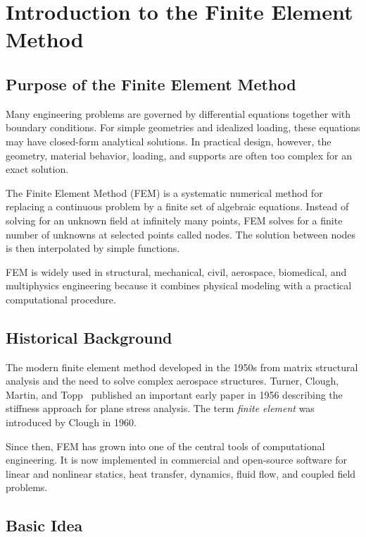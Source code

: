 \chapter{Introduction to the Finite Element Method}
\label{ch:intro}

\section{Purpose of the Finite Element Method}

Many engineering problems are governed by differential equations together with
boundary conditions. For simple geometries and idealized loading, these
equations may have closed-form analytical solutions. In practical design,
however, the geometry, material behavior, loading, and supports are often too
complex for an exact solution.

The Finite Element Method (FEM) is a systematic numerical method for replacing
a continuous problem by a finite set of algebraic equations. Instead of solving
for an unknown field at infinitely many points, FEM solves for a finite number
of unknowns at selected points called nodes. The solution between nodes is then
interpolated by simple functions.

FEM is widely used in structural, mechanical, civil, aerospace, biomedical, and
multiphysics engineering because it combines physical modeling with a practical
computational procedure.

\section{Historical Background}

The modern finite element method developed in the 1950s from matrix structural
analysis and the need to solve complex aerospace structures. Turner, Clough,
Martin, and Topp~\cite{zienkiewicz2005fem} published an important early paper
in 1956 describing the stiffness approach for plane stress analysis. The term
\emph{finite element} was introduced by Clough in 1960.

Since then, FEM has grown into one of the central tools of computational
engineering. It is now implemented in commercial and open-source software for
linear and nonlinear statics, heat transfer, dynamics, fluid flow, and coupled
field problems.

\section{Basic Idea}

